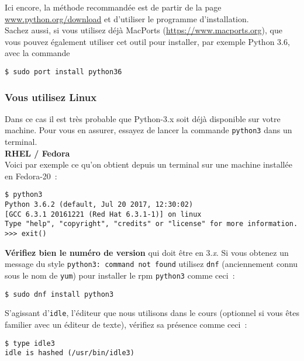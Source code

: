    Ici encore, la méthode recommandée est de partir de la page
\href{https://www.python.org/download}{www.python.org/download} et d'utiliser le programme
d'installation.\\

Sachez aussi, si vous utilisez déjà MacPorts (\href{https://www.macports.org}{https://www.macports.org}),
que vous pouvez également utiliser cet outil pour installer, par exemple
Python 3.6, avec la commande

    \begin{verbatim}
$ sudo port install python36
\end{verbatim}

    \hypertarget{vous-utilisez-linux}{%
\subsubsection{Vous utilisez Linux}\label{vous-utilisez-linux}}

    Dans ce cas il est très probable que Python-3.x soit déjà disponible sur
votre machine. Pour vous en assurer, essayez de lancer la commande
\texttt{python3} dans un terminal.\\

\textbf{RHEL / Fedora}\\


Voici par exemple ce qu'on obtient depuis un terminal sur une machine
installée en Fedora-20~:

    \begin{verbatim}
$ python3
Python 3.6.2 (default, Jul 20 2017, 12:30:02)
[GCC 6.3.1 20161221 (Red Hat 6.3.1-1)] on linux
Type "help", "copyright", "credits" or "license" for more information.
>>> exit()
\end{verbatim}

    \textbf{Vérifiez bien le numéro de version} qui doit être en 3.\emph{x}.
Si vous obtenez un message du style
\texttt{python3:\ command\ not\ found} utilisez \texttt{dnf}
(anciennement connu sous le nom de \texttt{yum}) pour installer le rpm
\texttt{python3} comme ceci~:

    \begin{verbatim}
$ sudo dnf install python3
\end{verbatim}

    S'agissant d'\texttt{idle}, l'éditeur que nous utilisons dans le cours
(optionnel si vous êtes familier avec un éditeur de texte), vérifiez sa
présence comme ceci~:

    \begin{verbatim}
$ type idle3
idle is hashed (/usr/bin/idle3)
\end{verbatim}

